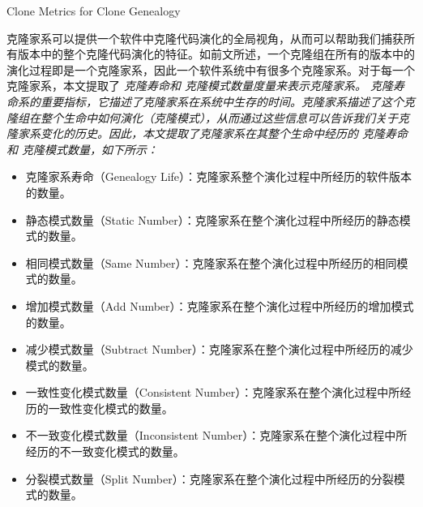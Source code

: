 {Clone Metrics for Clone Genealogy}

克隆家系可以提供一个软件中克隆代码演化的全局视角，从而可以帮助我们捕获所有版本中的整个克隆代码演化的特征。如前文所述，一个克隆组在所有的版本中的演化过程即是一个克隆家系，因此一个软件系统中有很多个克隆家系。对于每一个克隆家系，本文提取了\em{ 克隆寿命}和\em{ 克隆模式数量}度量来表示克隆家系。\em{ 克隆寿命系}的重要指标，它描述了克隆家系在系统中生存的时间。克隆家系描述了这个克隆组在整个生命中如何演化（克隆模式），从而通过这些信息可以告诉我们关于克隆家系变化的历史。因此，本文提取了克隆家系在其整个生命中经历的\em{ 克隆寿命}和\em{ 克隆模式数量}，如下所示：

\begin{itemize}
\item
克隆家系寿命（Genealogy  Life）：克隆家系整个演化过程中所经历的软件版本的数量。
\item
静态模式数量（Static Number）：克隆家系在整个演化过程中所经历的静态模式的数量。
\item
相同模式数量（Same Number）：克隆家系在整个演化过程中所经历的相同模式的数量。
\item
增加模式数量（Add Number）：克隆家系在整个演化过程中所经历的增加模式的数量。
\item
减少模式数量（Subtract Number）：克隆家系在整个演化过程中所经历的减少模式的数量。
\item
一致性变化模式数量（Consistent Number）：克隆家系在整个演化过程中所经历的一致性变化模式的数量。
\item
不一致变化模式数量（Inconsistent Number）：克隆家系在整个演化过程中所经历的不一致变化模式的数量。
\item
分裂模式数量（Split Number）：克隆家系在整个演化过程中所经历的分裂模式的数量。
\end{itemize}

